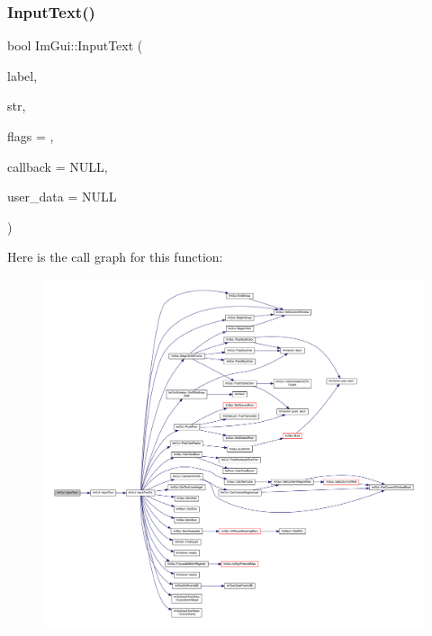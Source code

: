 \subsubsection{\texorpdfstring{Input\+Text()}{InputText()}\hspace{0.1cm}{\footnotesize\ttfamily [1/2]}}
{\footnotesize\ttfamily bool Im\+Gui\+::\+Input\+Text (\begin{DoxyParamCaption}\item[{const char $\ast$}]{label,  }\item[{std\+::string $\ast$}]{str,  }\item[{\mbox{\hyperlink{imgui_8h_a7d2c6153a6b9b5d3178ce82434ac9fb8}{Im\+Gui\+Input\+Text\+Flags}}}]{flags = {},  }\item[{\mbox{\hyperlink{imgui_8h_a65fd2b568a62c9aa2a28a8a13eb65ad7}{Im\+Gui\+Input\+Text\+Callback}}}]{callback = {\ttfamily NULL},  }\item[{void $\ast$}]{user\+\_\+data = {\ttfamily NULL} }\end{DoxyParamCaption})}

Here is the call graph for this function\+:
\nopagebreak
\begin{figure}[H]
\begin{center}
\leavevmode
\includegraphics[width=350pt]{namespace_im_gui_a1da680314eaf3f60ea2a42c76f3584b0_cgraph}
\end{center}
\end{figure}
\mbox{\label{namespace_im_gui_aa72b5760a3a206729723a587ac7c8519}} 
